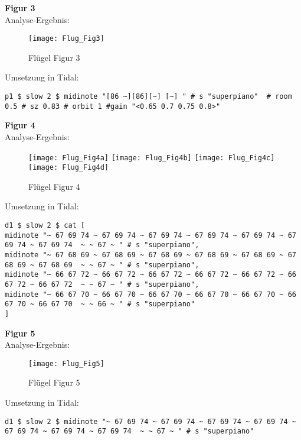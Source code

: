 \documentclass[
10pt, %
a4paper, %
oneside, %
headinclude,footinclude, %
BCOR5mm, %
]{scrartcl}
\begin{document}
\noindent \textbf{Figur 3}\\
Analyse-Ergebnis:
\begin{figure}[h]
	\centering 
	\texttt{[image: Flug\_Fig3]} 
	\caption{Flügel Figur 3}
\end{figure}

\noindent Umsetzung in Tidal:
\begin{lstlisting}
p1 $ slow 2 $ midinote "[86 ~][86][~] [~] " # s "superpiano"  # room 0.5 # sz 0.83 # orbit 1 #gain "<0.65 0.7 0.75 0.8>"
\end{lstlisting}


\noindent \textbf{Figur 4}\\
Analyse-Ergebnis:
\begin{figure}[h]
	\centering 
	\texttt{[image: Flug\_Fig4a]} 
	\texttt{[image: Flug\_Fig4b]} 
	\texttt{[image: Flug\_Fig4c]} 
	\texttt{[image: Flug\_Fig4d]} 
	\caption{Flügel Figur 4}
\end{figure}

\noindent Umsetzung in Tidal:
\begin{lstlisting}
d1 $ slow 2 $ cat [
midinote "~ 67 69 74 ~ 67 69 74 ~ 67 69 74 ~ 67 69 74 ~ 67 69 74 ~ 67 69 74 ~ 67 69 74  ~ ~ 67 ~ " # s "superpiano",
midinote "~ 67 68 69 ~ 67 68 69 ~ 67 68 69 ~ 67 68 69 ~ 67 68 69 ~ 67 68 69 ~ 67 68 69  ~ ~ 67 ~ " # s "superpiano",
midinote "~ 66 67 72 ~ 66 67 72 ~ 66 67 72 ~ 66 67 72 ~ 66 67 72 ~ 66 67 72 ~ 66 67 72  ~ ~ 67 ~ " # s "superpiano",
midinote "~ 66 67 70 ~ 66 67 70 ~ 66 67 70 ~ 66 67 70 ~ 66 67 70 ~ 66 67 70 ~ 66 67 70  ~ ~ 66 ~ " # s "superpiano"
]
\end{lstlisting}

\noindent \textbf{Figur 5}\\
Analyse-Ergebnis:
\begin{figure}[h]
	\centering 
	\texttt{[image: Flug\_Fig5]} 
	\caption{Flügel Figur 5}
\end{figure}

\noindent Umsetzung in Tidal:
\begin{lstlisting}
d1 $ slow 2 $ midinote "~ 67 69 74 ~ 67 69 74 ~ 67 69 74 ~ 67 69 74 ~ 67 69 74 ~ 67 69 74 ~ 67 69 74  ~ ~ 67 ~ " # s "superpiano"
\end{lstlisting}
\end{document}
